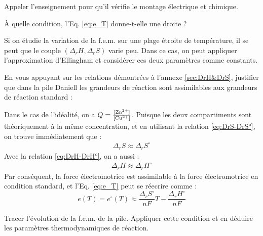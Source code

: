 \documentclass[twoside,a4paper,11pt,answers,addpoints]{exam}
\newcounter{foo} %
\begin{document}
\begin{questions}
\setcounter{question}{\thefoo}

\question[\half] Appeler l'enseignement pour qu'il vérifie le montage électrique et chimique.

\begin{framed}
\question[\half] \`{A} quelle condition, l'Eq. \ref{eq:e_T} donne-t-elle une droite ? 


\begin{solution}
Si on étudie la variation de la f.e.m. sur une plage étroite de température, il se peut que le couple $(\Delta_r H, \Delta_r S)$ varie peu. Dans ce cas, on peut appliquer l'approximation d'Ellingham et considérer ces deux paramètres comme constants.
\end{solution}

\end{framed}

\begin{framed}
\question[\half] En vous appuyant sur les relations démontrées à l'annexe \ref{sec:DrH&DrS}, justifier que dans la pile Daniell les grandeurs de réaction sont assimilables aux grandeurs de réaction standard : 


\begin{solution}
Dans le cas de l'idéalité, on a $Q = \frac{[\ce{Zn^{2+}}]}{[\ce{Cu^{2+}}]}$. Puisque les deux compartiments sont théoriquement à la même concentration, et en utilisant la relation \ref{eq:DrS-DrS°}, on trouve immédiatement que :
\begin{align*}
\Delta_r S \approx \Delta_r S^\circ
\end{align*}
Avec la relation \ref{eq:DrH-DrH°}, on a aussi : 
\begin{align*}
\Delta_r H \approx \Delta_r H^\circ
\end{align*}
Par conséquent, la force électromotrice est assimilable à la force électromotrice en condition standard, et l'Eq. \ref{eq:e_T} peut se réecrire comme : 
\begin{equation}
e (T) = e^\circ (T) \approx \frac{\Delta_r S^\circ}{nF} T - \frac{\Delta_r H^\circ}{nF} 
\end{equation}

\end{solution}

\end{framed}

\begin{framed}
\question[1\half] Tracer l'évolution de la f.e.m. de la pile. Appliquer cette condition et en déduire les paramètres thermodynamiques de réaction.



\end{framed}
\end{questions}
\end{document}
